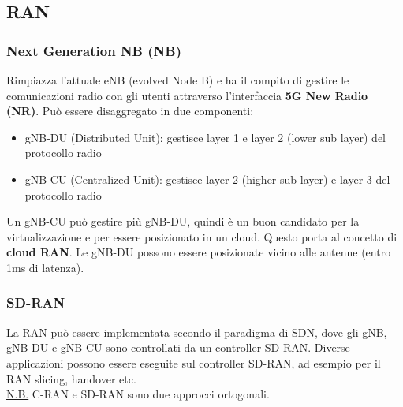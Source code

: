 \subsection{RAN}
\subsubsection{Next Generation NB (NB)}
Rimpiazza l'attuale eNB (evolved Node B) e ha il compito di gestire le comunicazioni radio con gli utenti attraverso l'interfaccia \textbf{5G New Radio (NR)}.
Può essere disaggregato in due componenti: 
\begin{itemize}
	\item gNB-DU (Distributed Unit): gestisce layer 1 e layer 2 (lower sub layer) del protocollo radio
	\item gNB-CU (Centralized Unit): gestisce layer 2 (higher sub layer) e layer 3 del protocollo radio
\end{itemize}
Un gNB-CU può gestire più gNB-DU, quindi è un buon candidato per la virtualizzazione e per essere posizionato in un cloud. Questo porta al concetto di \textbf{cloud RAN}.
Le gNB-DU possono essere posizionate vicino alle antenne (entro 1ms di latenza).
\subsubsection{SD-RAN}
La RAN può essere implementata secondo il paradigma di SDN, dove gli gNB, gNB-DU e gNB-CU sono controllati da un controller SD-RAN.
Diverse applicazioni possono essere eseguite sul controller SD-RAN, ad esempio per il RAN slicing, handover etc.
\\
\underline{N.B.} C-RAN e SD-RAN sono due approcci ortogonali.
